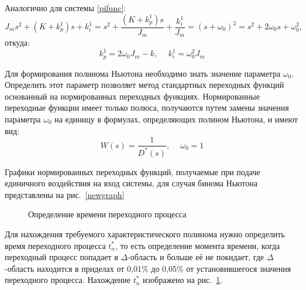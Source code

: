 Аналогично для системы \eqref{pifunc}:
\begin{equation}
	J_ms^2+(K+k_p^1)s+k_i^1 = s^2+\frac{(K+k_p^1)s}{J_m}+\frac{k_i^1}{J_m} =(s+\omega_0)^2= s^2+2\omega_0s+\omega_0^2,
\end{equation}
откуда:
\begin{equation}
	k_p^1 = 2\omega_0J_m-k, \phantom{- }k_i^1 = \omega_0^2J_m
\end{equation}

Для формирования полинома Ньютона необходимо знать значение параметра $\omega_0$.  Определить этот параметр позволяет метод стандартных переходных функций основанный на нормированных переходных функциях. Нормированные переходные функции имеет только полюса, получаются путем замены значения параметра $\omega_0$ на единицу в формулах, определяющих полином Ньютона, и имеют вид:
\begin{equation}
	W(s) = \frac{1}{D^*(s)}, \phantom{-} \omega_0=1
\end{equation}

Графики нормированных переходных функций, получаемые при подаче единичного воздействия на вход системы, для случая бинома Ньютона представлены на рис.~\ref{newgraph}

\begin{figure}[h]
	\noindent{}
	\caption{Определение времени переходного процесса }
	\label{newtime}
\end{figure}

Для нахождения требуемого характеристического полинома нужно определить время переходного процесса $t_n^*$, то есть определение момента времени, когда переходный процесс попадает в $\Delta$-область и больше её не покидает, где $\Delta$-область находится в приделах от 0,01\% до 0,05\% от установившегося значения переходного процесса. Нахождение  $t_n^*$ изображено на рис.~\ref{newtime}.

